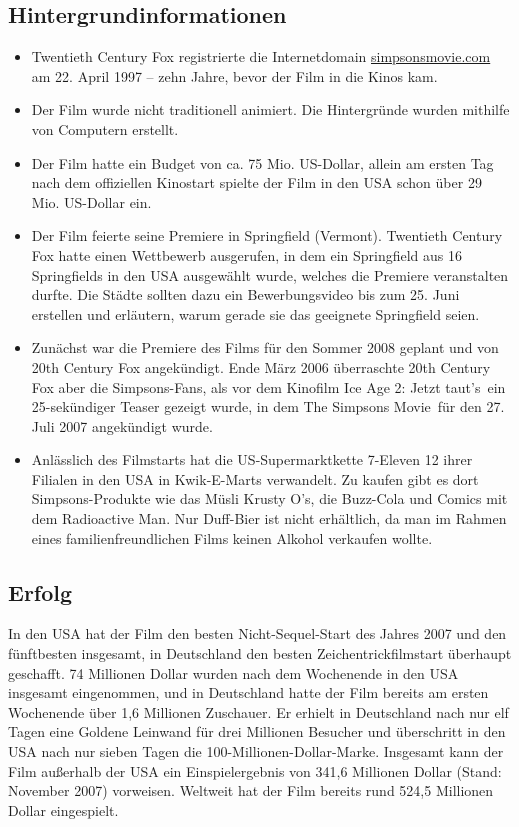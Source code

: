 \begin{appendix}
\subsection{Hintergrundinformationen}
\begin{itemize}
	\item Twentieth Century Fox registrierte die Internetdomain \url{simpsonsmovie.com} am 22. April 1997 -- zehn Jahre, bevor der Film in die Kinos kam.
	\item Der Film wurde nicht traditionell animiert. Die Hintergründe wurden mithilfe von Computern erstellt.
	\item Der Film hatte ein Budget von ca. 75 Mio. US-Dollar, allein am ersten Tag nach dem offiziellen Kinostart spielte der Film in den USA schon über 29 Mio. US-Dollar ein.
	\item Der Film feierte seine Premiere in Springfield (Vermont). Twentieth Century Fox hatte einen Wettbewerb ausgerufen, in dem ein Springfield aus 16 Springfields in den USA ausgewählt wurde, welches die Premiere veranstalten durfte. Die Städte sollten dazu ein Bewerbungsvideo bis zum 25. Juni erstellen und erläutern, warum gerade sie das geeignete Springfield seien.
	\item Zunächst war die Premiere des Films für den Sommer 2008 geplant und von 20th Century Fox angekündigt. Ende März 2006 überraschte 20th Century Fox aber die Simpsons-Fans, als vor dem Kinofilm \glqq Ice Age 2: Jetzt taut's\grqq\ ein 25-sekündiger Teaser gezeigt wurde, in dem \glqq The Simpsons Movie\grqq\ für den 27. Juli 2007 angekündigt wurde.
	\item Anlässlich des Filmstarts hat die US-Supermarktkette 7-Eleven 12 ihrer Filialen in den USA in Kwik-E-Marts verwandelt. Zu kaufen gibt es dort Simpsons-Produkte wie das Müsli Krusty O's, die Buzz-Cola und Comics mit dem Radioactive Man. Nur Duff-Bier ist nicht erhältlich, da man im Rahmen eines familienfreundlichen Films keinen Alkohol verkaufen wollte.
\end{itemize}

\subsection{Erfolg}
In den USA hat der Film den besten Nicht-Sequel-Start des Jahres 2007 und den fünftbesten insgesamt, in Deutschland den besten Zeichentrickfilmstart über\-haupt geschafft. 74 Millionen Dollar wurden nach dem Wochenende in den USA insgesamt eingenommen, und in Deutschland hatte der Film bereits am ersten Wochenende über 1,6 Millionen Zuschauer. Er erhielt in Deutschland nach nur elf Tagen eine Goldene Leinwand für drei Millionen Besucher und überschritt in den USA nach nur sieben Tagen die 100-Millionen-Dollar-Marke. Insgesamt kann der Film außerhalb der USA ein Einspielergebnis von 341,6 Millionen Dollar (Stand: November 2007) vorweisen. Weltweit hat der Film bereits rund 524,5 Millionen Dollar eingespielt.


\end{appendix}
